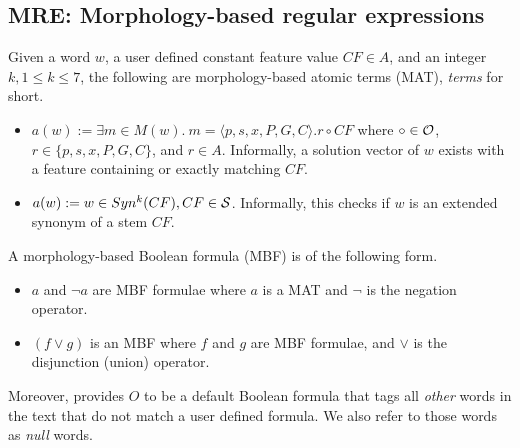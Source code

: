 \vspace{-1em}
\subsection{MRE: Morphology-based regular expressions}
\label{subsec:grammar}

Given a word $w$,
a user defined constant feature value $CF\in A$,
and an integer $k, 1\le k\le 7$, 
the following are morphology-based atomic terms (MAT), {\em terms} for short.
\begin{itemize}
  \item $a(w):= \exists m \in M(w).~m=\langle p,s,x,P,G,C\rangle. r \circ CF$
where $\circ \in {\cal O}$, $r \in \{p,s,x,P,G,C\}$, and $r\in A$.
Informally, a solution vector of $w$ exists with
a feature containing or exactly matching  $CF$.
\item $a(w) := w \in Syn^k(CF), CF \in \ss$.
  Informally, this checks if $w$ is an extended synonym of a stem $CF$. 
\end{itemize}

A morphology-based Boolean formula (MBF) is of the following form.
\begin{itemize}
  \item $a$ and $\neg a$ are MBF formulae where $a$ is a MAT and $\neg$ is the negation operator. 
  \item $(f \vee g)$ is an MBF where $f$ and $g$ are MBF formulae, 
    and $\vee$ is the disjunction (union) operator. 
\end{itemize}

Moreover, \framework provides $O$ to be a default Boolean formula that tags all {\em other} words in the text that do not match a user defined formula.
We also refer to those words as {\em null} words.



